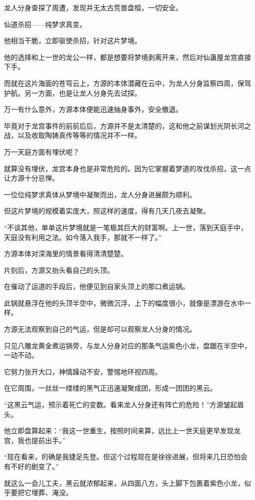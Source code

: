\begin{this_body}
龙人分身查探了周遭，发现并无太古荒兽盘桓，一切安全。

仙道杀招——纯梦求真变。

他相当干脆，立即驱使杀招，针对这片梦境。

他的选择和上一世的龙公一样，都是想要将梦境剥离开来，然后对仙蛊屋龙宫直接下手。

而就在这片海面的苍穹云上，方源的本体潜藏在云中，为龙人分身监察四周，保驾护航。另一方面，也是让龙人分身先去试探。

万一有什么意外，方源本体便能迅速抽身事外，安全撤退。

毕竟对于龙宫事件的前前后后，方源并不是太清楚的，这和他之前谋划光阴长河之战，以及收取陶铸真传等等的情况并不一样。

万一天庭方面有埋伏呢？

就算没有埋伏，龙宫本身也是非常危险的。因为它掌握着梦道的攻伐杀招，这一点让方源十分忌惮。

一位位纯梦求真体从梦境中凝聚而出，龙人分身进展颇为顺利。

但这片梦境的规模着实庞大，照这样的速度，得有几天几夜去凝聚。

“不谈其他，单单这片梦境就是一笔极其巨大的财富啊。上一世，落到天庭手中，天庭没有利用之法。如今落入我手，那就不一样了。”

方源本体对深海里的情景看得清清楚楚。

片刻后，方源又抬头看自己的头顶。

在催动了运道的手段后，他便见到自家头顶上的那口煮运锅。

此锅就悬浮在他的头顶半空中，微微沉浮，上下的幅度很小，就像是漂游在水中一样。

方源无法观察到自己的气运，但是却可以观察龙人分身的情况。

只见八雕龙黄金煮运锅旁，与龙人分身对应的那条气运紫色小龙，盘踞在半空中，一动不动。

它努力张开大口，神情躁动不安，警惕地环视四周。

在它周围，一丝丝一缕缕的黑气正迅速凝聚成团，形成一团团的黑云。

“这黑云气运，预示着死亡的变数。看来龙人分身还有阵亡的危险！”方源皱起眉头。

他立即盘算起来：“我这一世重生，按照时间来算，远比上一世天庭更早发现龙宫，我也提前出手。”

“现在看来，的确是我捷足先登。但这个过程现在是徐徐进展，但将来几日恐怕会有不好的剧变了。”

就这么一会儿工夫，黑云就浓郁起来，从四面八方，头上脚下包裹着紫色小龙，似乎要把它埋葬、淹没。


\end{this_body}
